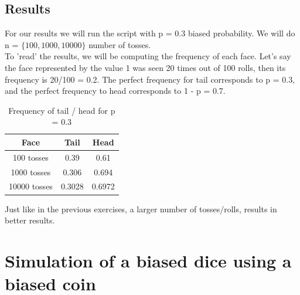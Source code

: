 \documentclass[a4paper]{article}
\begin{document}
\subsection*{Results}
For our results we will run the script with p = 0.3 biased probability. We will do n = $\{ 100, 1000, 10000\}$ number of tosses.\\
To 'read' the results, we will be computing the frequency of each face. Let's say the face represented by the value 1 was seen 20 times out of 100 rolls, then its frequency is 20/100 = 0.2. The perfect frequency for tail corresponds to p = 0.3, and the perfect frequency to head corresponds to 1 - p = 0.7.

\begin{table}[H]
\begin{center}
\begin{tabular}{|c|c|c|}
\hline
Face         & Tail   & Head   \\ \hline
100 tosses   & 0.39   & 0.61   \\ \hline
1000 tosses  & 0.306  & 0.694  \\ \hline
10000 tosses & 0.3028 & 0.6972 \\ \hline
\end{tabular}
\caption*{\label{BD} Frequency of tail / head for p = 0.3}
\end{center}
\end{table}
Just like in the previous exercises, a larger number of tosses/rolls, results in better results.


\newpage
\section*{Simulation of a biased dice using a biased coin}
\end{document}
